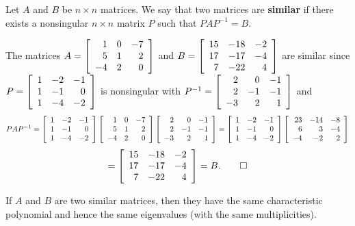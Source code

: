 \begin{Def} Let $A$ and $B$ be $n \times n$ matrices. We say that two matrices are \textbf{similar} if there exists a nonsingular $n\times n$ matrix $P$ such that $PAP^{-1} =  B$. 
\end{Def}

\begin{Exam} The matrices $A = \mtx{rrr}{1&0&-7\\5&1&2\\-4&2&0}$ and $B =\mtx{rrr}{15&-18&-2\\17&-17&-4\\7&-22&4}$ are similar since $P = \mtx{rrr}{1&-2&-1\\1&-1&0\\1&-4&-2}$ is nonsingular with $P^{-1} =  \mtx{rrr}{2&0&-1\\2&-1&-1\\-3&2&1}$ and 
\[PAP^{-1} = \mtx{rrr}{1&-2&-1\\1&-1&0\\1&-4&-2}\mtx{rrr}{1&0&-7\\5&1&2\\-4&2&0}\mtx{rrr}{2&0&-1\\2&-1&-1\\-3&2&1} = \mtx{rrr}{1&-2&-1\\1&-1&0\\1&-4&-2}\mtx{rrr}{23&-14&-8\\6&3&-4\\-4&-2&2}\] \[ = \mtx{rrr}{15&-18&-2\\17&-17&-4\\7&-22&4} = B. \qedhere\]
\end{Exam}

\begin{Thm} If $A$ and $B$ are two similar matrices, then they have the same characteristic polynomial and hence the same eigenvalues (with the same multiplicities).
\end{Thm}

